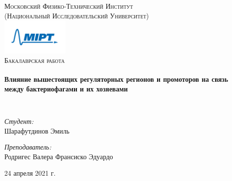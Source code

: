 \begin{titlepage}
\begin{center}

\textsc{\Large Московский Физико-Технический Институт}\\
\textsc{\large (Национальный Исследовательский Университет)}\\[1.5cm]

\includegraphics[width=0.25\textwidth]{img/logo.png}~\\[1cm]

\textsc{\Large Бакалаврская работа}\\[0.5cm]

\HRule \\[0.4cm]
{ \LARGE \bfseries Влияние вышестоящих регуляторных регионов и промоторов на связь между бактериофагами и их хозяевами \\[0.4cm] }

\HRule \\[1.5cm]

\noindent
\begin{minipage}{0.4\textwidth}
\begin{flushleft} \large
\emph{Студент:}\\
Шарафутдинов Эмиль
\end{flushleft}
\end{minipage}%
\begin{minipage}{0.4\textwidth}
\begin{flushright} \large
\emph{Преподаватель:} \\
 Родригес Валера Франсиско Эдуардо
\end{flushright}
\end{minipage}

\vfill

{\large 24 апреля 2021 г.}

\end{center}
\end{titlepage}